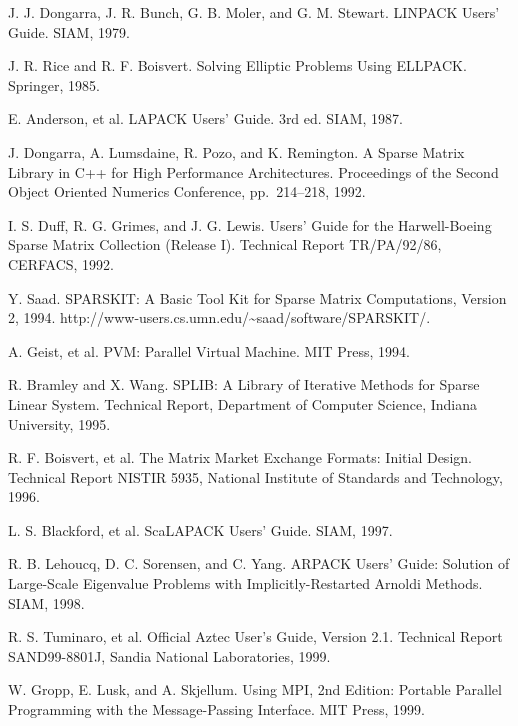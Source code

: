 \documentclass[a4paper]{article}
\begin{document}
\begin{thebibliography}{10}
J. J. Dongarra, J. R. Bunch, G. B. Moler, and G. M. Stewart.
\newblock LINPACK Users' Guide.
\newblock SIAM, 1979.

J. R. Rice and R. F. Boisvert.
\newblock Solving Elliptic Problems Using ELLPACK.
\newblock Springer, 1985.

E. Anderson, et al. 
\newblock LAPACK Users' Guide. 3rd ed.
\newblock SIAM, 1987.

J. Dongarra, A. Lumsdaine, R. Pozo, and K. Remington.
\newblock A Sparse Matrix Library in C++ for High Performance Architectures.
\newblock Proceedings of the Second Object Oriented Numerics Conference,
	pp.\ 214--218, 1992.

I. S. Duff, R. G. Grimes, and J. G. Lewis.
\newblock Users' Guide for the Harwell-Boeing Sparse Matrix Collection
(Release I).
\newblock Technical Report TR/PA/92/86, CERFACS, 1992.

Y. Saad.
\newblock SPARSKIT: A Basic Tool Kit for Sparse Matrix Computations,
  Version 2, 1994.
\newblock http://www-users.cs.umn.edu/\textasciitilde saad/software/SPARSKIT/.

A. Geist, et al.
\newblock PVM: Parallel Virtual Machine.
\newblock MIT Press, 1994.

R. Bramley and X. Wang.
\newblock SPLIB: A Library of Iterative Methods for Sparse Linear System.
\newblock Technical Report, Department of Computer Science, Indiana University, 1995.

R. F. Boisvert, et al. 
\newblock The Matrix Market Exchange Formats: Initial Design. 
\newblock Technical Report NISTIR 5935, National Institute of Standards and
	Technology, 1996.

L. S. Blackford, et al.
\newblock ScaLAPACK Users' Guide.
\newblock SIAM, 1997.

R. B. Lehoucq, D. C. Sorensen, and C. Yang.
\newblock ARPACK Users' Guide: Solution of Large-Scale Eigenvalue Problems with Implicitly-Restarted Arnoldi Methods. 
\newblock SIAM, 1998. 

R. S. Tuminaro, et al.
\newblock Official Aztec User's Guide, Version 2.1.
\newblock Technical Report SAND99-8801J, Sandia National Laboratories, 1999.

W. Gropp, E. Lusk, and A. Skjellum.
\newblock Using MPI, 2nd Edition: Portable Parallel Programming with the
	Message-Passing Interface.
\newblock MIT Press, 1999.


\end{thebibliography}
\end{document}
